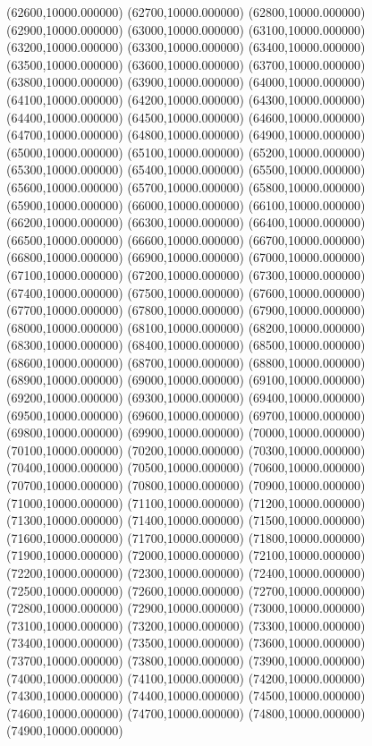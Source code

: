 (62600,10000.000000)
(62700,10000.000000)
(62800,10000.000000)
(62900,10000.000000)
(63000,10000.000000)
(63100,10000.000000)
(63200,10000.000000)
(63300,10000.000000)
(63400,10000.000000)
(63500,10000.000000)
(63600,10000.000000)
(63700,10000.000000)
(63800,10000.000000)
(63900,10000.000000)
(64000,10000.000000)
(64100,10000.000000)
(64200,10000.000000)
(64300,10000.000000)
(64400,10000.000000)
(64500,10000.000000)
(64600,10000.000000)
(64700,10000.000000)
(64800,10000.000000)
(64900,10000.000000)
(65000,10000.000000)
(65100,10000.000000)
(65200,10000.000000)
(65300,10000.000000)
(65400,10000.000000)
(65500,10000.000000)
(65600,10000.000000)
(65700,10000.000000)
(65800,10000.000000)
(65900,10000.000000)
(66000,10000.000000)
(66100,10000.000000)
(66200,10000.000000)
(66300,10000.000000)
(66400,10000.000000)
(66500,10000.000000)
(66600,10000.000000)
(66700,10000.000000)
(66800,10000.000000)
(66900,10000.000000)
(67000,10000.000000)
(67100,10000.000000)
(67200,10000.000000)
(67300,10000.000000)
(67400,10000.000000)
(67500,10000.000000)
(67600,10000.000000)
(67700,10000.000000)
(67800,10000.000000)
(67900,10000.000000)
(68000,10000.000000)
(68100,10000.000000)
(68200,10000.000000)
(68300,10000.000000)
(68400,10000.000000)
(68500,10000.000000)
(68600,10000.000000)
(68700,10000.000000)
(68800,10000.000000)
(68900,10000.000000)
(69000,10000.000000)
(69100,10000.000000)
(69200,10000.000000)
(69300,10000.000000)
(69400,10000.000000)
(69500,10000.000000)
(69600,10000.000000)
(69700,10000.000000)
(69800,10000.000000)
(69900,10000.000000)
(70000,10000.000000)
(70100,10000.000000)
(70200,10000.000000)
(70300,10000.000000)
(70400,10000.000000)
(70500,10000.000000)
(70600,10000.000000)
(70700,10000.000000)
(70800,10000.000000)
(70900,10000.000000)
(71000,10000.000000)
(71100,10000.000000)
(71200,10000.000000)
(71300,10000.000000)
(71400,10000.000000)
(71500,10000.000000)
(71600,10000.000000)
(71700,10000.000000)
(71800,10000.000000)
(71900,10000.000000)
(72000,10000.000000)
(72100,10000.000000)
(72200,10000.000000)
(72300,10000.000000)
(72400,10000.000000)
(72500,10000.000000)
(72600,10000.000000)
(72700,10000.000000)
(72800,10000.000000)
(72900,10000.000000)
(73000,10000.000000)
(73100,10000.000000)
(73200,10000.000000)
(73300,10000.000000)
(73400,10000.000000)
(73500,10000.000000)
(73600,10000.000000)
(73700,10000.000000)
(73800,10000.000000)
(73900,10000.000000)
(74000,10000.000000)
(74100,10000.000000)
(74200,10000.000000)
(74300,10000.000000)
(74400,10000.000000)
(74500,10000.000000)
(74600,10000.000000)
(74700,10000.000000)
(74800,10000.000000)
(74900,10000.000000)
